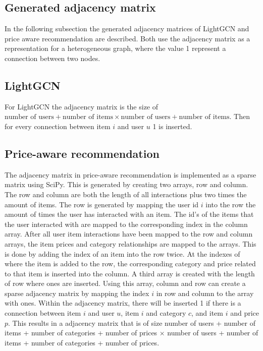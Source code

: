 \subsection{Generated adjacency matrix}
In the following subsection the generated adjacency matrices of LightGCN and price aware recommendation are described.
Both use the adjacency matrix as a representation for a heterogeneous graph, where the value 1 represent a connection between two nodes.

\subsection{LightGCN}
For LightGCN the adjacency matrix is the size of $\textrm{number of users} + \textrm{number of items} \times \textrm{number of users} + \textrm{number of items}$.
Then for every connection between item $i$ and user $u$ 1 is inserted.

\subsection{Price-aware recommendation}
The adjacency matrix in price-aware recommendation is implemented as a sparse matrix using SciPy.
This is generated by creating two arrays, row and column.
The row and column are both the length of all interactions plus two times the amount of items.
The row is generated by mapping the user id $i$ into the row the amount of times the user has interacted with an item.
The id's of the items that the user interacted with are mapped to the corresponding index in the column array.
After all user item interactions have been mapped to the row and column arrays, the item prices and category relationships are mapped to the arrays.
This is done by adding the index of an item into the row twice.
At the indexes of where the item is added to the row, the corresponding category and price related to that item is inserted into the column.
A third array is created with the length of row where ones are inserted.
Using this array, column and row can create a sparse adjacency matrix by mapping the index $i$ in row and column to the array with ones.
Within the adjacency matrix, there will be inserted 1 if there is a connection between item $i$ and user $u$, item $i$ and category $c$, and item $i$ and price $p$.
This results in a adjacency matrix that is of size number of users + number of items + number of categories + number of prices $\times$ number of users + number of items + number of categories + number of prices.
